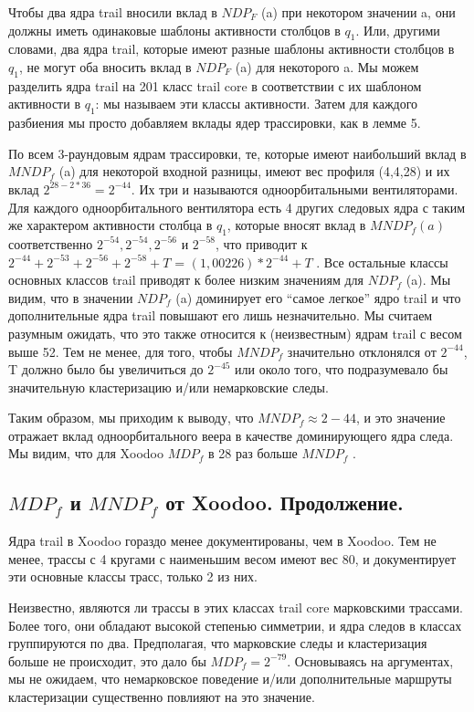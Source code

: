 \documentclass[utf8,14pt,a4paper,oneside,russian]{book}
\begin{document}
Чтобы два ядра trail вносили вклад в $NDP_F$ (a) при некотором значении a, 
они должны иметь одинаковые шаблоны активности столбцов в $q_1$. 
Или, другими словами, два ядра trail, которые имеют разные шаблоны 
активности столбцов в $q_1$, не могут оба вносить вклад в $NDP_F$ (a) 
для некоторого a. Мы можем разделить ядра trail на 201 класс trail core 
в соответствии с их шаблоном активности в $q_1$: мы называем эти классы 
активности. Затем для каждого разбиения мы просто добавляем вклады ядер 
трассировки, как в лемме 5.

По всем 3-раундовым ядрам трассировки, те, которые имеют наибольший вклад 
в $MNDP_f$ (a) для некоторой входной разницы, имеют вес профиля (4,4,28) 
и их вклад $2^{28-2*36} =2^{-44}$. Их три и называются одноорбитальными 
вентиляторами. Для каждого одноорбитального вентилятора есть 4 других 
следовых ядра с таким же характером активности столбца в $q_1$, которые 
вносят вклад в $MNDP_f (a)$ соответственно $2^{-54}, 2^{-54}, 2^{-56}$ и 
$2^{-58}$, что приводит к $2^{-44} + 2^{-53} + 2^{-56} + 2^{-58} + T$ = 
$(1,00226) * 2^{-44} + T$ . Все остальные классы основных классов trail 
приводят к более низким значениям для $NDP_f$ (a). Мы видим, что в 
значении $NDP_f$ (a) доминирует его “самое легкое” ядро trail и что 
дополнительные ядра trail повышают его лишь незначительно. Мы считаем 
разумным ожидать, что это также относится к (неизвестным) ядрам trail с 
весом выше 52. Тем не менее, для того, чтобы $MNDP_f$ значительно 
отклонялся от $2^{-44}$, T должно было бы увеличиться до $2^{-45}$ или 
около того, что подразумевало бы значительную кластеризацию и/или 
немарковские следы.

Таким образом, мы приходим к выводу, что $MNDP_f \approx 2-44$, и это 
значение отражает вклад одноорбитального веера в качестве доминирующего 
ядра следа. Мы видим, что для Xoodoo $MDP_f$ в 28 раз больше $MNDP_f$ .

\subsection{$MDP_f$ и $MNDP_f$ от Xoodoo. Продолжение.}

Ядра trail в Xoodoo гораздо менее документированы, чем в Xoodoo. 
Тем не менее, трассы с 4 кругами с наименьшим 
весом имеют вес 80, и документирует эти основные классы трасс, только 2 
из них.

Неизвестно, являются ли трассы в этих классах trail core марковскими 
трассами. Более того, они обладают высокой степенью симметрии, и ядра 
следов в классах группируются по два. Предполагая, что марковские следы и 
кластеризация больше не происходит, это дало бы $MDP_f = 2^{-79}$. 
Основываясь на аргументах, мы не ожидаем, что немарковское поведение 
и/или дополнительные маршруты кластеризации существенно повлияют на это 
значение.
\end{document}
